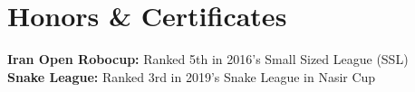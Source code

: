
\section{Honors \& Certificates}
  \vspace{2pt}
  \resumeSubHeadingListStart
    \small{\item{
        \textbf{Iran Open Robocup:} { Ranked 5th in 2016's Small Sized League (SSL)}
        \\ \vspace{3pt}
        \textbf{Snake League:} { Ranked 3rd in 2019's Snake League in Nasir Cup}
    }}
  \resumeSubHeadingListEnd